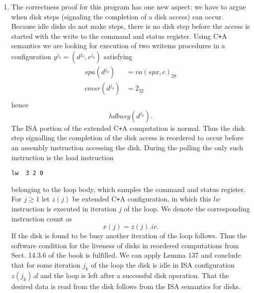 \documentclass{article}
\begin{document}
\begin{enumerate}
{\begin{enumerate}
{\begin{itemize}
                        
                    \end{itemize}
                }
                \item {
                    The correctness proof for this program has one new aspect: we have to argue when disk steps (signaling the completion of a disk access) can occur. Because idle disks do not make steps, there is no disk step before the access is started with the write to the command and status register. Using C\verb|+|A semantics we are looking for execution of two writems procedures in a configuration $y^{j_0}=(d^{j_0}, c^{j_0})$ satisfying
                    \begin{displaymath}
                        \begin{aligned}
                            spa(d^{j_0}) &= va(spx, c)_{28} \\
                            cmsr(d^{j_0}) &= 2_{32} \\
                        \end{aligned}
                    \end{displaymath}
                    hence
                    \begin{displaymath}
                        hdbusy(d^{j_0}).
                    \end{displaymath}
                    The ISA portion of the extended C\verb|+|A computation is normal. Thus the disk step signalling the completion of the disk access is reordered to occur before an assembly instruction accessing the disk. During the polling the only such instruction is the load instruction
                    \begin{lstlisting}[numbers=none]
lw  3 2 0
\end{lstlisting}
                    belonging to the loop body, which samples the command and status register. For $j \geq 1$ let $z(j)$ be extended C\verb|+|A configuration, in which this $lw$ instruction is executed in iteration $j$ of the loop. We denote the corresponding instruction count as
                    \begin{displaymath}
                        x(j) = z(j).ic.
                    \end{displaymath}
                    If the disk is found to be busy another iteration of the loop follows. Thus the software condition for the liveness of disks in reordered computations from Sect. 14.3.6 of the book is fulfilled. We can apply Lemma 137 and conclude that for some iteration $j_k$ of the loop the disk is idle in ISA configuration $z(j_k).d$ and the loop is left after a successful disk operation. That the desired data is read from the disk follows from the ISA semantics for disks.
                }
            \end{enumerate}
        }
    \end{enumerate}
\end{document}
